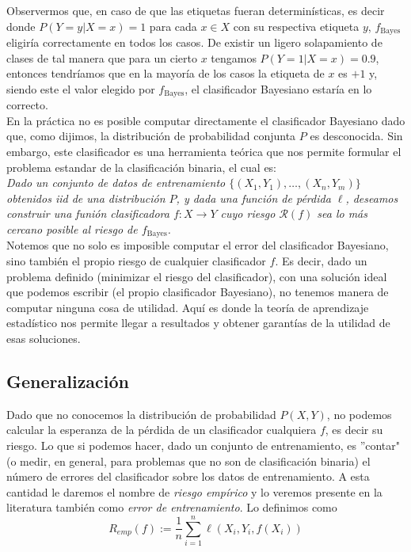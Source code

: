 \documentclass{article}
\begin{document}
Observermos que, en caso de que las etiquetas fueran determinísticas, es decir donde $P(Y=y|X=x)=1$ para cada $x\in X$ con su
respectiva etiqueta $y$, $f_{\text{Bayes}}$ eligiría correctamente en todos los casos. De existir un ligero solapamiento de clases 
de tal manera que para un cierto $x$ tengamos $P(Y=1|X=x) = 0.9$, entonces tendríamos
que en la mayoría de los casos la etiqueta de $x$ es $+1$ y, siendo este el valor elegido por $f_{\text{Bayes}}$, el clasificador
Bayesiano estaría en lo correcto.\\

En la práctica no es posible computar directamente el clasificador Bayesiano dado que, como dijimos, la distribución de probabilidad
conjunta $P$ es desconocida. Sin embargo, este clasificador es una herramienta teórica que nos permite formular el problema
estandar de la clasificación binaria, el cual es:\\

\textit{Dado un conjunto de datos de entrenamiento $ \{ (X_1,Y_1),\dots,(X_n, Y_m)\}$ obtenidos iid de una distribución $P$, y dada una
función de pérdida $\ell$, deseamos construir una funión clasificadora $f:X\rightarrow Y$ cuyo riesgo $\mathcal{R}(f)$ sea lo
más cercano posible al riesgo de $f_{\text{Bayes}}$.}\\

Notemos que no solo es imposible computar el error del clasificador Bayesiano, sino también el propio riesgo de cualquier clasificador
$f$. Es decir, dado un problema definido (minimizar el riesgo del clasificador), con una solución ideal que podemos escribir (el propio
clasificador Bayesiano), no tenemos manera de computar ninguna cosa de utilidad. Aquí es donde la teoría de aprendizaje estadístico
nos permite llegar a resultados y obtener garantías de la utilidad de esas soluciones.

\subsection{Generalización}

Dado que no conocemos la distribución de probabilidad $P(X,Y)$, no podemos calcular la esperanza de la pérdida de un clasificador cualquiera
$f$, es decir su riesgo. Lo que si podemos hacer, dado un conjunto de entrenamiento, es ''contar" (o medir, en general, para problemas
que no son de clasificación binaria) el número de errores del clasificador sobre los datos de entrenamiento. A esta cantidad le daremos
el nombre de \textit{riesgo empírico} y lo veremos presente en la literatura también como \textit{error de entrenamiento}. Lo definimos
como
$$
R_{emp}(f) := \frac{1}{n} \sum_{i=1}^n \ell(X_i,Y_i,f(X_i))
$$
\end{document}
